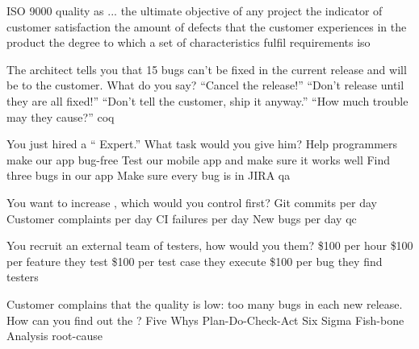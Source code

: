\documentclass{article}
\begin{document}


\pmbaQuestion
  {ISO 9000  quality as ...}
  {the ultimate objective of any project}
  {the indicator of customer satisfaction}
  {the amount of defects that the customer experiences in the product}
  {the degree to which a set of characteristics fulfil requirements}
  {iso}

\pmbaQuestion
  {The architect tells you that 15 bugs can't be fixed in the current release
    and will be  to the customer. What do you say?}
  {``Cancel the release!''}
  {``Don't release until they are all fixed!''}
  {``Don't tell the customer, ship it anyway.''}
  {``How much trouble may they cause?''}
  {coq}

\pmbaQuestion
  {You just hired a `` Expert.'' What task would you give him?}
  {Help programmers make our app bug-free}
  {Test our mobile app and make sure it works well}
  {Find three bugs in our app}
  {Make sure every bug is in JIRA}
  {qa}

\pmbaQuestion
  {You want to increase ,
    which  would you control first?}
  {Git commits per day}
  {Customer complaints per day}
  {CI failures per day}
  {New bugs per day}
  {qc}

\pmbaQuestion
  {You recruit an external team of testers, how would you  them?}
  {\$100 per hour}
  {\$100 per feature they test}
  {\$100 per test case they execute}
  {\$100 per bug they find}
  {testers}

\pmbaQuestion
  {Customer complains that the quality is low:
    too many bugs in each new release.
    How can you find out the ?}
  {Five Whys}
  {Plan-Do-Check-Act}
  {Six Sigma}
  {Fish-bone Analysis}
  {root-cause}
\end{document}
